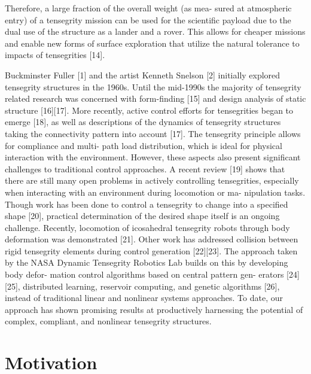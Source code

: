 Therefore, a large fraction of the overall weight (as mea-
sured  at  atmospheric  entry)  of  a  tensegrity  mission  can  be
used  for  the  scientific  payload  due  to  the  dual  use  of  the
structure  as  a  lander  and  a  rover.  This  allows  for  cheaper
missions  and  enable  new  forms  of  surface  exploration  that
utilize the natural tolerance to impacts of tensegrities [14].

Buckminster Fuller [1] and the artist Kenneth Snelson [2]
initially  explored  tensegrity  structures  in  the  1960s.  Until
the  mid-1990s  the  majority  of  tensegrity  related  research
was  concerned  with  form-finding  [15]  and  design  analysis
of  static  structure  [16][17].  More  recently,  active  control
efforts  for  tensegrities  began  to  emerge  [18],  as  well  as
descriptions  of  the  dynamics  of  tensegrity  structures  taking
the connectivity pattern into account [17].
The tensegrity principle allows for compliance and multi-
path load distribution, which is ideal for physical interaction
with  the  environment.  However,  these  aspects  also  present
significant  challenges  to  traditional  control  approaches.  A
recent  review  [19]  shows  that  there  are  still  many  open
problems in actively controlling tensegrities, especially when
interacting  with  an  environment  during  locomotion  or  ma-
nipulation  tasks.  Though  work  has  been  done  to  control  a
tensegrity  to  change  into  a  specified  shape  [20],  practical
determination  of  the  desired  shape  itself  is  an  ongoing
challenge.  Recently,  locomotion  of  icosahedral  tensegrity
robots  through  body  deformation  was  demonstrated  [21].
Other work has addressed collision between rigid tensegrity
elements during control generation [22][23].
The  approach  taken  by  the  NASA  Dynamic  Tensegrity
Robotics  Lab  builds  on  this  by  developing  body  defor-
mation  control  algorithms  based  on  central  pattern  gen-
erators  [24][25],  distributed  learning,  reservoir  computing,
and  genetic  algorithms  [26],  instead  of  traditional  linear
and  nonlinear  systems  approaches.  To  date,  our  approach
has  shown  promising  results  at  productively  harnessing  the
potential  of  complex,  compliant,  and  nonlinear  tensegrity
structures.

\section{Motivation}

